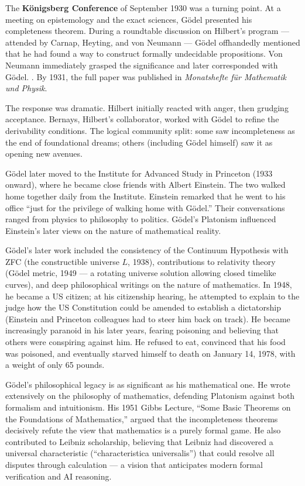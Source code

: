 The \textbf{Königsberg Conference} of September 1930 was a turning point. At a meeting on epistemology and the exact sciences, Gödel presented his completeness theorem. During a roundtable discussion on Hilbert's program --- attended by Carnap, Heyting, and von Neumann --- Gödel offhandedly mentioned that he had found a way to construct formally undecidable propositions. Von Neumann immediately grasped the significance and later corresponded with Gödel. \cite{godel1931}. By 1931, the full paper was published in \emph{Monatshefte für Mathematik und Physik}.

The response was dramatic. Hilbert initially reacted with anger, then grudging acceptance. Bernays, Hilbert's collaborator, worked with Gödel to refine the derivability conditions. The logical community split: some saw incompleteness as the end of foundational dreams; others (including Gödel himself) saw it as opening new avenues.

Gödel later moved to the Institute for Advanced Study in Princeton (1933 onward), where he became close friends with Albert Einstein. The two walked home together daily from the Institute. Einstein remarked that he went to his office ``just for the privilege of walking home with Gödel.'' Their conversations ranged from physics to philosophy to politics. Gödel's Platonism influenced Einstein's later views on the nature of mathematical reality.

Gödel's later work included the consistency of the Continuum Hypothesis with ZFC (the constructible universe $L$, 1938), contributions to relativity theory (Gödel metric, 1949 --- a rotating universe solution allowing closed timelike curves), and deep philosophical writings on the nature of mathematics. In 1948, he became a US citizen; at his citizenship hearing, he attempted to explain to the judge how the US Constitution could be amended to establish a dictatorship (Einstein and Princeton colleagues had to steer him back on track). He became increasingly paranoid in his later years, fearing poisoning and believing that others were conspiring against him. He refused to eat, convinced that his food was poisoned, and eventually starved himself to death on January 14, 1978, with a weight of only 65 pounds.

Gödel's philosophical legacy is as significant as his mathematical one. He wrote extensively on the philosophy of mathematics, defending Platonism against both formalism and intuitionism. His 1951 Gibbs Lecture, ``Some Basic Theorems on the Foundations of Mathematics,'' argued that the incompleteness theorems decisively refute the view that mathematics is a purely formal game. He also contributed to Leibniz scholarship, believing that Leibniz had discovered a universal characteristic (``characteristica universalis'') that could resolve all disputes through calculation --- a vision that anticipates modern formal verification and AI reasoning.

